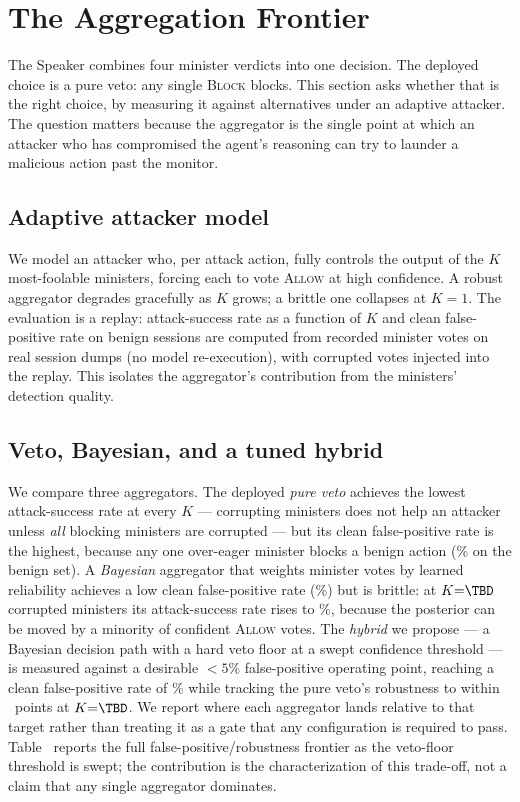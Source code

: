 
\section{The Aggregation Frontier}
\label{sec:frontier}
The Speaker combines four minister verdicts into one decision. The deployed
choice is a pure veto: any single \textsc{Block} blocks. This section asks
whether that is the right choice, by measuring it against alternatives under an
adaptive attacker. The question matters because the aggregator is the single
point at which an attacker who has compromised the agent's reasoning can try to
launder a malicious action past the monitor.

\subsection{Adaptive attacker model}
\label{sec:advmodel}
We model an attacker who, per attack action, fully controls the output of the
$K$ most-foolable ministers, forcing each to vote \textsc{Allow} at high
confidence. A robust aggregator degrades gracefully as $K$ grows; a brittle one
collapses at $K{=}1$. The evaluation is a replay: attack-success rate as a
function of $K$ and clean false-positive rate on benign sessions are computed
from recorded minister votes on real session dumps (no model re-execution), with
corrupted votes injected into the replay. This isolates the aggregator's
contribution from the ministers' detection quality.

\subsection{Veto, Bayesian, and a tuned hybrid}
\label{sec:vetobayes}
We compare three aggregators. The deployed \emph{pure veto} achieves the lowest
attack-success rate at every $K$ --- corrupting ministers does not help an
attacker unless \emph{all} blocking ministers are corrupted --- but its clean
false-positive rate is the highest, because any one over-eager minister blocks a
benign action (\TBD\% on the benign set). A \emph{Bayesian} aggregator that
weights minister votes by learned reliability achieves a low clean
false-positive rate (\TBD\%) but is brittle: at $K{=}\TBD$ corrupted ministers
its attack-success rate rises to \TBD\%, because the posterior can be moved by a
minority of confident \textsc{Allow} votes. The \emph{hybrid} we propose --- a
Bayesian decision path with a hard veto floor at a swept confidence threshold
--- is measured against a desirable ${<}5\%$ false-positive operating point,
reaching a clean false-positive rate of \TBD\% while tracking the pure veto's
robustness to within \TBD\ points at $K{=}\TBD$. We report where each aggregator
lands relative to that target rather than treating it as a gate that any
configuration is required to pass. Table~\TBD{} reports the
full false-positive/robustness frontier as the veto-floor threshold is swept;
the contribution is the characterization of this trade-off, not a claim that any
single aggregator dominates.

